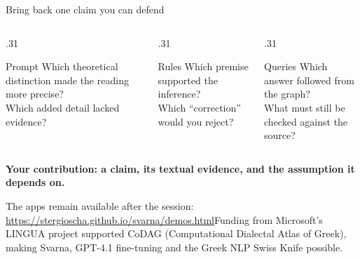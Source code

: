 \documentclass[aspectratio=169,10pt]{beamer}
\newcommand{\key}[1]{\textcolor{aegean}{\textbf{#1}}}
\newcommand{\source}[1]{\vfill{\scriptsize\color{slate}#1\par}}
\begin{document}
\begin{frame}{Bring back one claim you can defend}
  \begin{columns}[T]
    \begin{column}{.31\textwidth}
      \begin{block}{Prompt}
        Which theoretical distinction made the reading more precise?\\[8pt]
        Which added detail lacked evidence?
      \end{block}
    \end{column}
    \begin{column}{.31\textwidth}
      \begin{block}{Rules}
        Which premise supported the inference?\\[8pt]
        Which “correction” would you reject?
      \end{block}
    \end{column}
    \begin{column}{.31\textwidth}
      \begin{block}{Queries}
        Which answer followed from the graph?\\[8pt]
        What must still be checked against the source?
      \end{block}
    \end{column}
  \end{columns}
  \vspace{1em}
  {\large\key{Your contribution: a claim, its textual evidence, and the assumption it depends on.}\par}
  \source{The apps remain available after the session: \url{https://stergioscha.github.io/svarna/demos.html}\newline Funding from Microsoft's LINGUA project supported CoDAG (Computational Dialectal Atlas of Greek), making Svarna, GPT-4.1 fine-tuning and the Greek NLP Swiss Knife possible.}
\end{frame}
\end{document}
